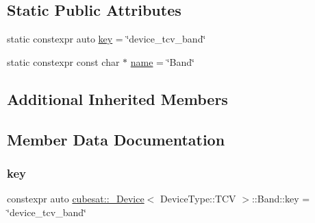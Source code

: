 \subsection*{Static Public Attributes}
\begin{DoxyCompactItemize}
\item 
static constexpr auto \hyperlink{structcubesat_1_1__Device_3_01DeviceType_1_1TCV_01_4_1_1Band_a87ab66013e393fb47978707248636818}{key} = \char`\"{}device\+\_\+tcv\+\_\+band\char`\"{}
\item 
static constexpr const char $\ast$ \hyperlink{structcubesat_1_1__Device_3_01DeviceType_1_1TCV_01_4_1_1Band_a1892bd8138e2f980e59cbf93703131a8}{name} = \char`\"{}Band\char`\"{}
\end{DoxyCompactItemize}
\subsection*{Additional Inherited Members}


\subsection{Member Data Documentation}
\mbox{\label{structcubesat_1_1__Device_3_01DeviceType_1_1TCV_01_4_1_1Band_a87ab66013e393fb47978707248636818}} 
\subsubsection{\texorpdfstring{key}{key}}
{\footnotesize\ttfamily constexpr auto \hyperlink{structcubesat_1_1__Device}{cubesat\+::\+\_\+\+Device}$<$ Device\+Type\+::\+T\+CV $>$\+::Band\+::key = \char`\"{}device\+\_\+tcv\+\_\+band\char`\"{}\hspace{0.3cm}{\ttfamily [static]}}

\mbox{\label{structcubesat_1_1__Device_3_01DeviceType_1_1TCV_01_4_1_1Band_a1892bd8138e2f980e59cbf93703131a8}} 
